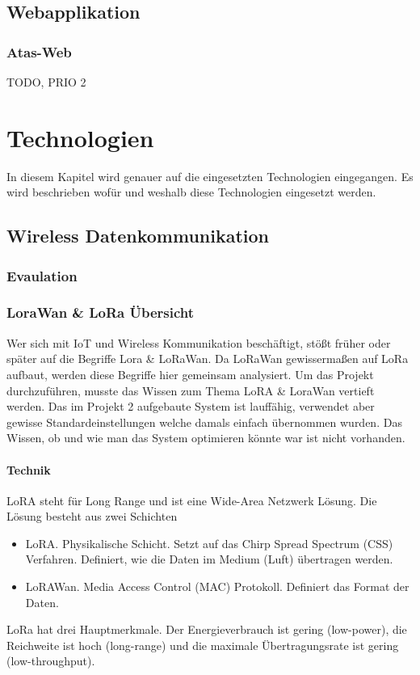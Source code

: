 \documentclass[11pt,english,german]{report}
\theoremstyle{definition}
\begin{document}
\newpage
\section{Webapplikation}
\subsection{Atas-Web}
TODO, PRIO 2

\chapter{Technologien}
In diesem Kapitel wird genauer auf die eingesetzten Technologien eingegangen. Es wird beschrieben wofür und weshalb diese Technologien eingesetzt werden. 

\section{Wireless Datenkommunikation}
\subsection{Evaulation}

\subsection{LoraWan \& LoRa Übersicht}
Wer sich mit IoT und Wireless Kommunikation beschäftigt, stößt früher oder später auf die Begriffe Lora \& LoRaWan. Da LoRaWan gewissermaßen auf LoRa aufbaut, werden diese Begriffe hier gemeinsam analysiert. Um das Projekt durchzuführen, musste das Wissen zum Thema LoRA \& LoraWan vertieft werden. Das im Projekt 2 aufgebaute System ist lauffähig, verwendet aber gewisse Standardeinstellungen welche damals einfach übernommen wurden. Das Wissen, ob und wie man das System optimieren könnte war ist nicht vorhanden.
\subsubsection{Technik}
LoRA steht für Long Range und ist eine Wide-Area Netzwerk Lösung. Die Lösung besteht aus zwei Schichten
\begin{itemize}
	\item LoRA. Physikalische Schicht. Setzt auf das Chirp Spread Spectrum (CSS) Verfahren. Definiert, wie die Daten im Medium (Luft) übertragen werden.
 	\item LoRAWan. Media Access Control (MAC) Protokoll. Definiert das Format der Daten.
\end{itemize}
LoRa hat drei Hauptmerkmale. Der Energieverbrauch ist gering (low-power), die Reichweite ist hoch (long-range) und die maximale Übertragungsrate ist gering (low-throughput).\\[0.3cm]
\end{document}
